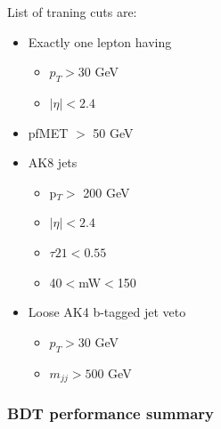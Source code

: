 List of traning cuts are:
\begin{itemize}
	\item Exactly one lepton having
	\begin{itemize}
		\item $p_T > 30$ GeV
		\item $|\eta| < 2.4$
	\end{itemize}
	\item pfMET $>$ 50 GeV
	\item AK8 jets
	\begin{itemize}
		\item  p$_T >$ 200 GeV
		\item $|\eta|<2.4$
		\item $\tau 21 < 0.55$
		\item 40$<$mW$<$150
	\end{itemize}
	\item Loose AK4 b-tagged jet veto
	\begin{itemize}
		\item $p_T>30$ GeV
		\item $m_{jj}>500$ GeV
	\end{itemize}
\end{itemize}

\subsubsection{BDT performance summary}

